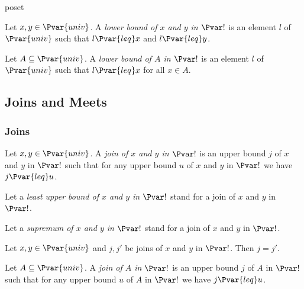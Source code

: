 \documentclass{stex}
\begin{document}
\begin{smodule}{poset}
  \begin{forthel}    
    \begin{definition*}
      Let $x, y \in \Pvar{univ}$.
      A \emph{lower bound of $x$ and $y$ in $\Pvar!$} is an element $l$ of $\Pvar{univ}$ such that $l {\Pvar{leq}} x$ and $l {\Pvar{leq}} y$.
    \end{definition*}
    
    \begin{definition*}
      Let $A \subseteq \Pvar{univ}$.
      A \emph{lower bound of $A$ in $\Pvar!$} is an element $l$ of $\Pvar{univ}$ such that $l {\Pvar{leq}} x$ for all $x \in A$.
    \end{definition*}
  \end{forthel}

  \subsection{Joins and Meets}

  \subsubsection{Joins}

  \begin{forthel}
    \begin{definition*}
      Let $x, y \in \Pvar{univ}$.
      A \emph{join of $x$ and $y$ in $\Pvar!$} is an upper bound $j$ of $x$ and $y$ in $\Pvar!$ such that for any upper bound $u$ of $x$ and $y$ in $\Pvar!$ we have $j {\Pvar{leq}} u$.
    \end{definition*}

    Let a \emph{least upper bound of $x$ and $y$ in $\Pvar!$} stand for a join of $x$ and $y$ in $\Pvar!$.

    Let a \emph{supremum of $x$ and $y$ in $\Pvar!$} stand for a join of $x$ and $y$ in $\Pvar!$.

    \begin{proposition*}
      Let $x, y \in \Pvar{univ}$ and $j, j'$ be joins of $x$ and $y$ in $\Pvar!$.
      Then $j = j'$.
    \end{proposition*}
    
    \begin{definition*}
      Let $A \subseteq \Pvar{univ}$.
      A \emph{join of $A$ in $\Pvar!$} is an upper bound $j$ of $A$ in $\Pvar!$ such that for any upper bound $u$ of $A$ in $\Pvar!$ we have $j {\Pvar{leq}} u$.
    \end{definition*}


\end{forthel}
\end{smodule}
\end{document}
